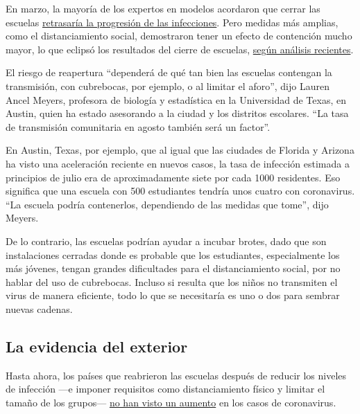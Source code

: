 En marzo, la mayoría de los expertos en modelos acordaron que cerrar las
escuelas
\href{https://www.nytimes.com/2020/05/05/health/coronavirus-children-transmission-school.html}{retrasaría
la progresión de las infecciones}. Pero medidas más amplias, como el
distanciamiento social, demostraron tener un efecto de contención mucho
mayor, lo que eclipsó los resultados del cierre de escuelas,
\href{https://www.medrxiv.org/content/10.1101/2020.04.16.20068403v1}{según
análisis recientes}.

El riesgo de reapertura ``dependerá de qué tan bien las escuelas
contengan la transmisión, con cubrebocas, por ejemplo, o al limitar el
aforo'', dijo Lauren Ancel Meyers, profesora de biología y estadística
en la Universidad de Texas, en Austin, quien ha estado asesorando a la
ciudad y los distritos escolares. ``La tasa de transmisión comunitaria
en agosto también será un factor''.

En Austin, Texas, por ejemplo, que al igual que las ciudades de Florida
y Arizona ha visto una aceleración reciente en nuevos casos, la tasa de
infección estimada a principios de julio era de aproximadamente siete
por cada 1000 residentes. Eso significa que una escuela con 500
estudiantes tendría unos cuatro con coronavirus. ``La escuela podría
contenerlos, dependiendo de las medidas que tome'', dijo Meyers.

De lo contrario, las escuelas podrían ayudar a incubar brotes, dado que
son instalaciones cerradas donde es probable que los estudiantes,
especialmente los más jóvenes, tengan grandes dificultades para el
distanciamiento social, por no hablar del uso de cubrebocas. Incluso si
resulta que los niños no transmiten el virus de manera eficiente, todo
lo que se necesitaría es uno o dos para sembrar nuevas cadenas.

\hypertarget{la-evidencia-del-exterior}{%
\subsection{La evidencia del exterior}\label{la-evidencia-del-exterior}}

Hasta ahora, los países que reabrieron las escuelas después de reducir
los niveles de infección ---e imponer requisitos como distanciamiento
físico y limitar el tamaño de los grupos---
\href{https://globalhealth.washington.edu/sites/default/files/COVID-19\%20Schools\%20Summary\%20\%282\%29.pdf?mkt_tok=eyJpIjoiTkRreE5XWXlORFF3TXpNeCIsInQiOiJIbVNQTTVySEo0Vzk1cHVBZVVqWnFGVmR1UEJxRGdpd01mTXg4OGw3Mk5nTnpmaUoyMGt2UXIwWVZBOE5GVjIybHA5aStrbzJ3MUxsanoxamZibmlocmpSbXZyVFVoV0VHYU1aTGx0RnpsMXlmOEtXSVJqaDJsZ0RJU1BQcVZjZSJ9}{no
han visto un aumento} en los casos de coronavirus.


